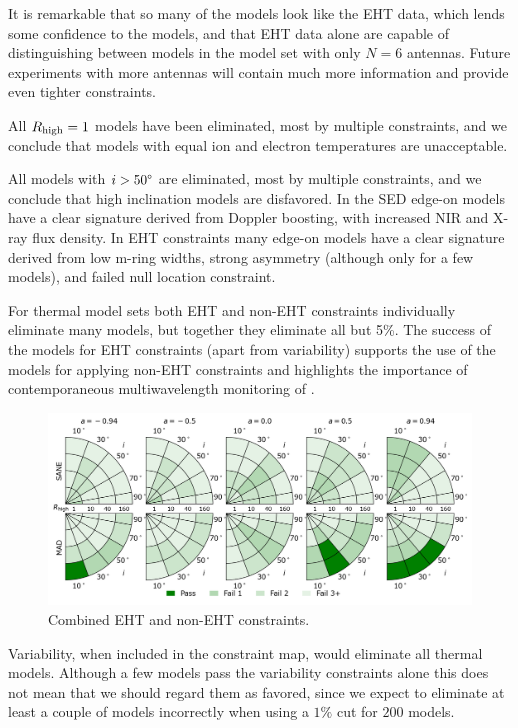 It is remarkable that so many of the models look like the EHT data, which lends some  confidence to the models, and that EHT data alone are capable of distinguishing between models in the model set with only $N = 6$ antennas.  Future experiments with more antennas will contain much more information and provide even tighter constraints.

All $R_\mathrm{high} = 1$ models have been eliminated, most by multiple constraints, and we conclude that models with equal ion and electron temperatures are unacceptable.

All models with $i > 50\degree$ are eliminated, most by multiple constraints, and we conclude that high inclination models are disfavored.  In the SED edge-on models have a clear signature derived from Doppler boosting, with increased NIR and X-ray flux density.  In EHT constraints many edge-on models have a clear signature derived from low m-ring widths, strong asymmetry (although only for a few models), and failed null location constraint.

For thermal model sets both EHT and non-EHT constraints individually eliminate many models, but together they eliminate all but 5\%.  The success of the models for EHT constraints (apart from variability) supports the use of the models for applying non-EHT constraints and highlights the importance of contemporaneous multiwavelength monitoring of \sgra.

\begin{figure}
  \centering
  \includegraphics[width=\textwidth]{./figures/All_Constraints.png}
  \caption{Combined EHT and non-EHT constraints.}
  \label{fig:all_cuts}
\end{figure}

Variability, when included in the constraint map, would eliminate all thermal models.  Although a few models pass the variability constraints alone this does not mean that we should regard them as favored, since we expect to eliminate at least a couple of models incorrectly when using a $1\%$ cut for $200$ models.

